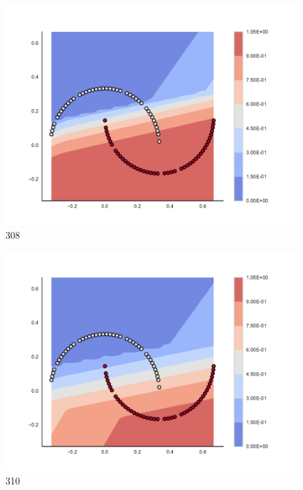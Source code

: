 \begin{subfigure}[b]{0.09\textwidth}
    \includegraphics[clip, trim=2.35cm 1.75cm 4.5cm 0cm,width=\textwidth]{img/convergence/308.pdf}
    \caption{308}
    \label{fig:convergence_308}
\end{subfigure}
%
\begin{subfigure}[b]{0.09\textwidth}
    \includegraphics[clip, trim=2.35cm 1.75cm 4.5cm 0cm,width=\textwidth]{img/convergence/310.pdf}
    \caption{310}
    \label{fig:convergence_310}
\end{subfigure}
%
